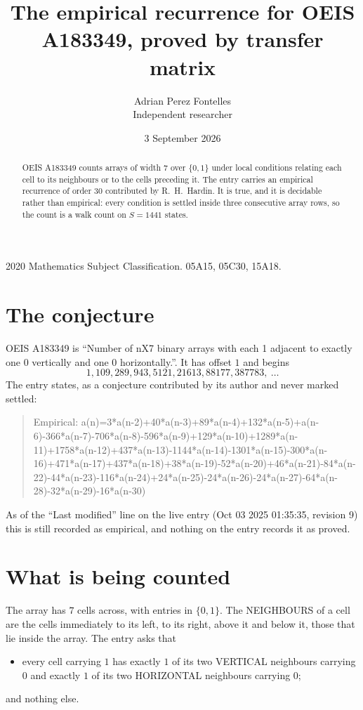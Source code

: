 \documentclass[11pt,a4paper]{article}
\title{The empirical recurrence for OEIS A183349, proved by transfer matrix}
\author{Adrian Perez Fontelles\\ \small Independent researcher}
\date{3 September 2026}
\theoremstyle{plain}
\theoremstyle{definition}
\begin{document}
\maketitle

\begin{abstract}
OEIS A183349 counts arrays of width $7$ over $\{0,1\}$ under local conditions relating each cell
to its neighbours or to the cells preceding it. The entry carries an empirical recurrence of
order $30$ contributed by R.~H.~Hardin. It is true, and it is decidable rather than
empirical: every condition is settled inside three consecutive array rows, so the count is a
walk count on $S=1441$ states.
\end{abstract}

\noindent\small 2020 Mathematics Subject Classification. 05A15, 05C30, 15A18.\normalsize

\section{The conjecture}

OEIS A183349 is ``Number of nX7 binary arrays with each 1 adjacent to exactly one 0 vertically and one 0 horizontally.''. It has offset $1$ and begins
\[
1, 109, 289, 943, 5121, 21613, 88177, 387783,\ \dots
\]
The entry states, as a conjecture contributed by its author and never marked settled:
\begin{quote}
Empirical: a(n)=3*a(n-2)+40*a(n-3)+89*a(n-4)+132*a(n-5)+a(n-6)-366*a(n-7)-706*a(n-8)-596*a(n-9)+129*a(n-10)+1289*a(n-11)+1758*a(n-12)+437*a(n-13)-1144*a(n-14)-1301*a(n-15)-300*a(n-16)+471*a(n-17)+437*a(n-18)+38*a(n-19)-52*a(n-20)+46*a(n-21)-84*a(n-22)-44*a(n-23)-116*a(n-24)+24*a(n-25)-24*a(n-26)-24*a(n-27)-64*a(n-28)-32*a(n-29)-16*a(n-30)
\end{quote}
As of the ``Last modified'' line on the live entry (Oct 03 2025 01:35:35, revision 9) this is still
recorded as empirical, and nothing on the entry records it as proved.

\section{What is being counted}

The array has $7$ cells across, with entries in $\{0,1\}$. The NEIGHBOURS of a cell are the
cells immediately to its left, to its right, above it and below it, those that lie inside the
array. The entry asks that
\begin{itemize}
\item every cell carrying $1$ has exactly $1$ of its two VERTICAL neighbours carrying $0$ and exactly $1$ of its two HORIZONTAL neighbours carrying $0$;
\end{itemize}
and nothing else.
\end{document}

